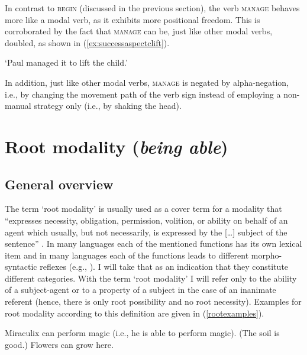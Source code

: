 \noindent In contrast to \textsc{begin} (discussed in the previous section), the verb \textsc{manage} behaves more like a modal verb, as it exhibits more positional freedom. This is corroborated by the fact that \textsc{manage} can be, just like other modal verbs, doubled, as shown in (\ref{ex:successaspectclift}).

\begin{exe}
\glt `Paul managed it to lift the child.' \label{ex:successaspectclift}
\end{exe} 

\noindent In addition, just like other modal verbs, \textsc{manage} is negated by alpha-negation, i.e., by changing the movement path of the verb sign instead of employing a non-manual strategy only (i.e., by shaking the head).

\largerpage[1.5]
\section{Root modality (\textit{being able})}\label{rootmodality}
\subsection{General overview}
The term `root modality' is usually used as a cover term for a modality that ``expresses necessity, obligation, permission, volition, or ability on behalf of an agent which usually, but not necessarily, is expressed by the [\dots ] subject of the sentence'' \citep[44]{platzack1979semantic}. In many languages each of the mentioned functions has its own lexical item and in many languages each of the functions leads to different morpho-syntactic reflexes (e.g., \citealt{bross2017swabian}). I will take that as an indication that they constitute different categories. With the term `root modality' I will refer only to the ability of a subject-agent or to a property of a subject in the case of an inanimate referent (hence, there is only root possibility and no root necessity). Examples for root modality according to this definition are given in (\ref{rootexamples}).

\begin{exe}
\ex\label{rootexamples}\begin{xlist}
\ex Miraculix can perform magic (i.e., he is able to perform magic).
\ex (The soil is good.) Flowers can grow here.
\end{xlist}
\end{exe}

